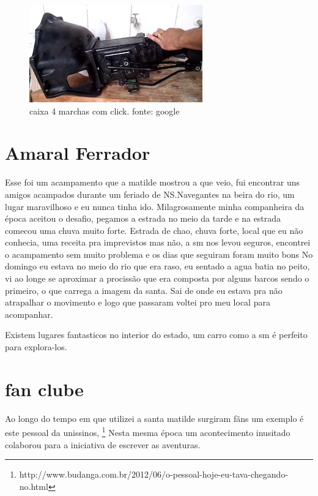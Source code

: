 \documentclass[a4paper]{report}
\begin{document}
\begin{figure}[!htb]
\centering
\includegraphics{caixa4}
\caption{caixa 4 marchas com click. fonte: google}
\label{4 marchas opala varetada}
\end{figure}
\clearpage


\section*{Amaral Ferrador}

Esse foi um acampamento que a matilde mostrou a que veio, fui encontrar uns amigos acampados durante
um feriado de NS.Navegantes na beira do rio, um lugar maravilhoso e eu nunca tinha ido.
Milagrosamente minha companheira da \'epoca aceitou o desafio, pegamos a estrada no meio da tarde e 
na estrada comecou uma chuva muito forte.
Estrada de chao, chuva forte, local que eu n\~ao conhecia, uma receita pra imprevistos mas n\~ao,
a sm nos levou seguros, encontrei o acampamento sem muito problema e os dias que seguiram foram muito bons
No domingo eu estava no meio do rio que era raso, eu sentado a agua batia no peito, vi ao longe se aproximar
a prociss\~ao que era composta por alguns barcos sendo o primeiro, o que carrega a imagem da santa.
Sai de onde eu estava pra n\~ao atrapalhar o movimento e logo que passaram voltei pro meu local para acompanhar.

Existem lugares fantasticos no interior do estado, um carro como a sm \'e perfeito para explora-los.


\section*{fan clube}

Ao longo do tempo em que utilizei a santa matilde surgiram f\~ans um exemplo \'e este pessoal da unissinos, \footnote{http://www.budanga.com.br/2012/06/o-pessoal-hoje-eu-tava-chegando-no.html} 
Nesta mesma \'epoca um acontecimento inusitado colaborou para a iniciativa de escrever as aventuras.
\end{document}
